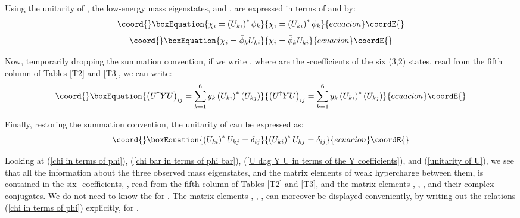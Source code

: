 \documentclass[a4paper,12pt,oneside]{article}
\begin{document}
Using the unitarity of \coordHE{}, the low-energy mass eigenstates, 
\coordHE{} and \coordHE{}, are expressed in terms of \coordHE{} and
\coordHE{} by:
\begin{equation}\coord{}\boxEquation{\label{chi in terms of phi}
\chi_i=\left(U_{ki}\right)^*\phi_k
}{\chi_i=\left(U_{ki}\right)^*\phi_k
}{ecuacion}\coordE{}\end{equation}
\begin{equation}\coord{}\boxEquation{\label{chi bar in terms of phi bar}
\bar{\chi}_i=\bar{\phi}_kU_{ki}
}{\bar{\chi}_i=\bar{\phi}_kU_{ki}
}{ecuacion}\coordE{}\end{equation}

Now, temporarily dropping the summation convention, if we write
\coordHE{}, where \coordHE{} are the \coordHE{}-coefficients of the
six (3,2) states, read from the fifth column of Tables \ref{T2} and
\ref{T3}, we can write:
\begin{equation}\coord{}\boxEquation{\label{U dag Y U in terms of the Y coefficients}
\left(U^\dag YU\right)_{ij}=\sum_{k=1}^6y_k\left(U_{ki}\right)^*
\left(U_{kj}\right)
}{\left(U^\dag YU\right)_{ij}=\sum_{k=1}^6y_k\left(U_{ki}\right)^*
\left(U_{kj}\right)
}{ecuacion}\coordE{}\end{equation}

Finally, restoring the summation convention, the unitarity of \coordHE{}
can be expressed as:
\begin{equation}\coord{}\boxEquation{\label{unitarity of U}
\left(U_{ki}\right)^*U_{kj}=\delta_{ij}
}{\left(U_{ki}\right)^*U_{kj}=\delta_{ij}
}{ecuacion}\coordE{}\end{equation}

Looking at (\ref{chi in terms of phi}),
(\ref{chi bar in terms of phi bar}),
(\ref{U dag Y U in terms of the Y coefficients}), and
(\ref{unitarity of U}), we see that all the information about the
three observed mass eigenstates, and the matrix elements of weak
hypercharge between them, is contained in the six \coordHE{}-coefficients,
\coordHE{}, read from the fifth column of Tables \ref{T2} and \ref{T3},
and the matrix elements \coordHE{}, \coordHE{}, \coordHE{},
and their complex conjugates.  We do not need to know the \coordHE{}
for \coordHE{}.  The matrix elements \coordHE{}, 
\coordHE{}, \coordHE{}, can moreover be displayed 
conveniently, by writing out the relations 
(\ref{chi in terms of phi}) explicitly, for \coordHE{}.
\end{document}
